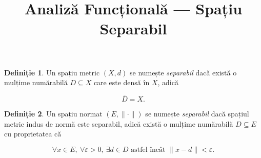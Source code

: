 \documentclass[12pt]{article}
\title{Analiză Funcțională — Spațiu Separabil}
\author{}
\date{}
\theoremstyle{definition}
\newtheorem{definition}{Definiție}
\begin{document}
\maketitle

\begin{definition}
Un spațiu metric $(X,d)$ se numește \emph{separabil} dacă există o mulțime numărabilă
$D \subseteq X$ care este densă în $X$, adică


\[
\overline{D} = X.
\]


\end{definition}

\begin{definition}
Un spațiu normat $(E,\|\cdot\|)$ se numește \emph{separabil} dacă spațiul metric
indus de normă este separabil, adică există o mulțime numărabilă $D \subseteq E$
cu proprietatea că


\[
\forall x \in E,\ \forall \varepsilon > 0,\ \exists d \in D \text{ astfel încât }
\|x-d\| < \varepsilon.
\]


\end{definition}
\end{document}
